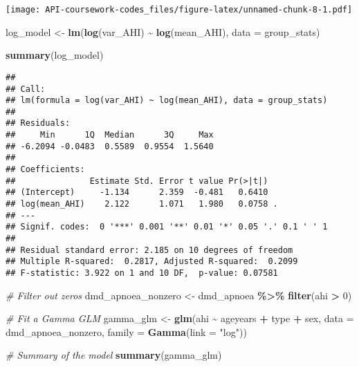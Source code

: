 \documentclass[
]{article}
\newenvironment{Shaded}{\begin{snugshade}}{\end{snugshade}}
\newcommand{\AttributeTok}[1]{\textcolor[rgb]{0.13,0.29,0.53}{#1}}
\newcommand{\CommentTok}[1]{\textcolor[rgb]{0.56,0.35,0.01}{\textit{#1}}}
\newcommand{\DecValTok}[1]{\textcolor[rgb]{0.00,0.00,0.81}{#1}}
\newcommand{\FunctionTok}[1]{\textcolor[rgb]{0.13,0.29,0.53}{\textbf{#1}}}
\newcommand{\NormalTok}[1]{#1}
\newcommand{\OtherTok}[1]{\textcolor[rgb]{0.56,0.35,0.01}{#1}}
\newcommand{\SpecialCharTok}[1]{\textcolor[rgb]{0.81,0.36,0.00}{\textbf{#1}}}
\newcommand{\StringTok}[1]{\textcolor[rgb]{0.31,0.60,0.02}{#1}}
\begin{document}
\texttt{[image: API-coursework-codes\_files/figure-latex/unnamed-chunk-8-1.pdf]}

\begin{Shaded}
\begin{Highlighting}[]
\NormalTok{log\_model }\OtherTok{\textless{}{-}} \FunctionTok{lm}\NormalTok{(}\FunctionTok{log}\NormalTok{(var\_AHI) }\SpecialCharTok{\textasciitilde{}} \FunctionTok{log}\NormalTok{(mean\_AHI), }\AttributeTok{data =}\NormalTok{ group\_stats)}

\FunctionTok{summary}\NormalTok{(log\_model)}
\end{Highlighting}
\end{Shaded}

\begin{verbatim}
## 
## Call:
## lm(formula = log(var_AHI) ~ log(mean_AHI), data = group_stats)
## 
## Residuals:
##     Min      1Q  Median      3Q     Max 
## -6.2094 -0.0483  0.5589  0.9554  1.5640 
## 
## Coefficients:
##               Estimate Std. Error t value Pr(>|t|)  
## (Intercept)     -1.134      2.359  -0.481   0.6410  
## log(mean_AHI)    2.122      1.071   1.980   0.0758 .
## ---
## Signif. codes:  0 '***' 0.001 '**' 0.01 '*' 0.05 '.' 0.1 ' ' 1
## 
## Residual standard error: 2.185 on 10 degrees of freedom
## Multiple R-squared:  0.2817, Adjusted R-squared:  0.2099 
## F-statistic: 3.922 on 1 and 10 DF,  p-value: 0.07581
\end{verbatim}

\begin{Shaded}
\begin{Highlighting}[]
\CommentTok{\# Filter out zeros}
\NormalTok{dmd\_apnoea\_nonzero }\OtherTok{\textless{}{-}}\NormalTok{ dmd\_apnoea }\SpecialCharTok{\%\textgreater{}\%} \FunctionTok{filter}\NormalTok{(ahi }\SpecialCharTok{\textgreater{}} \DecValTok{0}\NormalTok{)}

\CommentTok{\# Fit a Gamma GLM}
\NormalTok{gamma\_glm }\OtherTok{\textless{}{-}} \FunctionTok{glm}\NormalTok{(ahi }\SpecialCharTok{\textasciitilde{}}\NormalTok{ ageyears }\SpecialCharTok{+}\NormalTok{ type }\SpecialCharTok{+}\NormalTok{ sex, }
                 \AttributeTok{data =}\NormalTok{ dmd\_apnoea\_nonzero, }
                 \AttributeTok{family =} \FunctionTok{Gamma}\NormalTok{(}\AttributeTok{link =} \StringTok{"log"}\NormalTok{))}

\CommentTok{\# Summary of the model}
\FunctionTok{summary}\NormalTok{(gamma\_glm)}
\end{Highlighting}
\end{Shaded}
\end{document}
